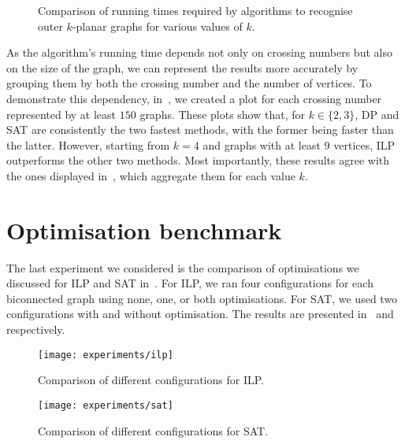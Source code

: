 \begin{figure}[tbh]
    \centering
     \hfill
     \hfill
     \hfill
     \hfill
    \caption{Comparison of running times required by algorithms to recognise outer \(k\)-planar graphs for various values of \(k\).}
    \label{fig:methods-vertices}
\end{figure}

As the algorithm's running time depends not only on crossing numbers but also on the size of the graph, we can represent the results more accurately by grouping them by both the crossing number and the number of vertices. To demonstrate this dependency, in~, we created a plot for each crossing number represented by at least \(150\) graphs. These plots show that, for \(k \in \{2, 3\}\), \textsf{DP} and \textsf{SAT} are consistently the two fastest methods, with the former being faster than the latter. However, starting from \(k = 4\) and graphs with at least \(9\) vertices, \textsf{ILP} outperforms the other two methods. Most importantly, these results agree with the ones displayed in~, which aggregate them for each value \(k\).


\section{Optimisation benchmark}

The last experiment we considered is the comparison of optimisations we discussed for \textsf{ILP} and \textsf{SAT} in~. For \textsf{ILP}, we ran four configurations for each biconnected graph using none, one, or both optimisations. For \textsf{SAT}, we used two configurations with and without optimisation. The results are presented in~ and~ respectively.

\begin{figure}[tbh]
    \centering
    \texttt{[image: experiments/ilp]}
    \caption{Comparison of different configurations for \textsf{ILP}.}
    \label{fig:optimisation:ilp}
\end{figure}

\begin{figure}[tbh]
    \centering
    \texttt{[image: experiments/sat]}
    \caption{Comparison of different configurations for \textsf{SAT}.}
    \label{fig:optimisation:sat}
\end{figure}

